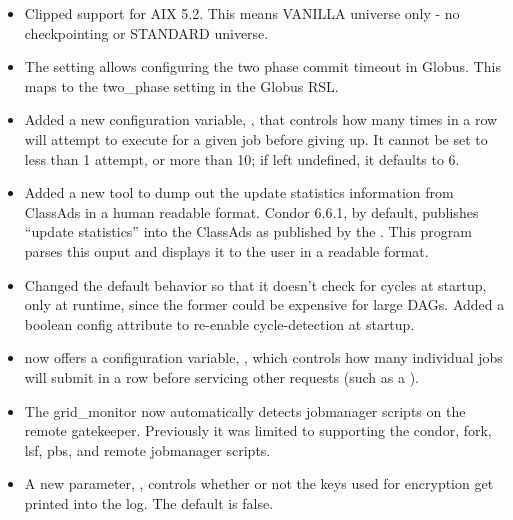 \begin{itemize}

\item Clipped support for AIX 5.2.
      This means VANILLA universe only - no checkpointing or STANDARD universe.

\item The setting  allows
   configuring the two phase commit timeout in Globus.  This maps to the
   two\_phase setting in the Globus RSL.

\item Added a new configuration variable,
      , that controls how many
      times in a row  will attempt to execute
       for a given job before giving up.  It cannot be
      set to less than 1 attempt, or more than 10; if left undefined,
      it defaults to 6.

\item Added a new tool  to dump out the update
statistics information from ClassAds in a human readable format.
Condor 6.6.1, by default, publishes ``update statistics'' into the
ClassAds as published by the .  This program parses
this ouput and displays it to the user in a readable format.

\item Changed the default  behavior so that it doesn't
      check for cycles at startup, only at runtime, since the former
      could be expensive for large DAGs.  Added a boolean
       config attribute to
      re-enable cycle-detection at startup.

\item {} now offers a configuration variable,
      , which controls how
      many individual jobs  will submit in a row before
      servicing other requests (such as a ).

\item The grid\_monitor now automatically detects jobmanager scripts on the
      remote gatekeeper.  Previously it was limited to supporting the condor,
	  fork, lsf, pbs, and remote jobmanager scripts.

\item A new parameter, , controls whether or not
      the keys used for encryption get printed into the log.
	  The default is false.


\end{itemize}

